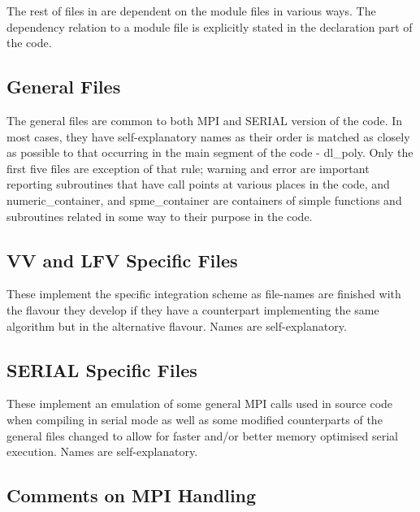 The rest of files in \D are dependent on the module files in
various ways.  The dependency relation to a module file is
explicitly stated in the declaration part of the code.

\subsection{General Files}

The \D general files are common to both MPI and SERIAL version of
the code.  In most cases, they have self-explanatory names as their
order is matched as closely as possible to that occurring in the
main segment of the code - {\sc dl\_poly}.  Only the first five
files are exception of that rule; {\sc warning} and {\sc error} are
important reporting subroutines that have call points at various
places in the code, and {\sc numeric\_container}, and
{\sc spme\_container} are containers of simple functions and
subroutines related in some way to their purpose in the code.

\subsection{VV and LFV Specific Files}

These implement the specific integration scheme as file-names are
finished with the flavour they develop if they have a counterpart
implementing the same algorithm but in the alternative flavour.
Names are self-explanatory.

\subsection{SERIAL Specific Files}

These implement an emulation of some general MPI calls used in \D
source code when compiling in serial mode as well as some modified
counterparts of the general files changed to allow for faster and/or
better memory optimised serial execution.  Names are
self-explanatory.

\subsection{Comments on MPI Handling}


